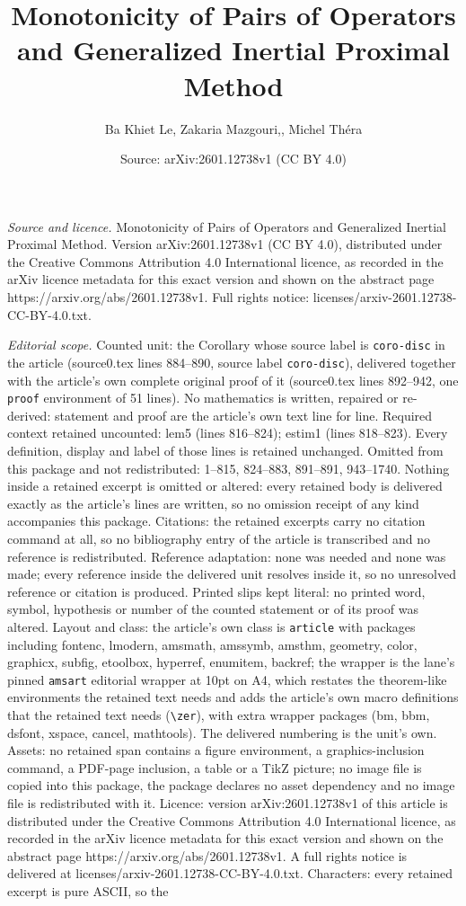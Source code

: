 \documentclass[10pt,a4paper]{amsart}
\title[Monotonicity of Pairs of Operators and Generalized Inertial ]{Monotonicity of Pairs of Operators and Generalized Inertial Proximal Method}
\author{Ba Khiet Le, Zakaria Mazgouri,, Michel Th\'era}
\date{Source: arXiv:2601.12738v1 (CC BY 4.0)}
\begin{document}
\maketitle

\noindent\emph{Source and licence.} Monotonicity of Pairs of Operators and Generalized Inertial Proximal Method. Version arXiv:2601.12738v1 (CC BY 4.0), distributed under the Creative Commons Attribution 4.0 International licence, as recorded in the arXiv licence metadata for this exact version and shown on the abstract page https://arxiv.org/abs/2601.12738v1. Full rights notice: licenses/arxiv-2601.12738-CC-BY-4.0.txt.\par\smallskip

\noindent\textit{Editorial scope.} Counted unit: the Corollary whose source label is \texttt{coro-disc} in the article (source0.tex lines 884--890, source label \texttt{coro-disc}), delivered together with the article's own complete original proof of it (source0.tex lines 892--942, one \texttt{proof} environment of 51 lines). No mathematics is written, repaired or re-derived: statement and proof are the article's own text line for line. Required context retained uncounted: lem5 (lines 816--824); estim1 (lines 818--823). Every definition, display and label of those lines is retained unchanged. Omitted from this package and not redistributed: 1--815, 824--883, 891--891, 943--1740. Nothing inside a retained excerpt is omitted or altered: every retained body is delivered exactly as the article's lines are written, so no omission receipt of any kind accompanies this package. Citations: the retained excerpts carry no citation command at all, so no bibliography entry of the article is transcribed and no reference is redistributed. Reference adaptation: none was needed and none was made; every reference inside the delivered unit resolves inside it, so no unresolved reference or citation is produced. Printed slips kept literal: no printed word, symbol, hypothesis or number of the counted statement or of its proof was altered. Layout and class: the article's own class is \texttt{article} with packages including fontenc, lmodern, amsmath, amssymb, amsthm, geometry, color, graphicx, subfig, etoolbox, hyperref, enumitem, backref; the wrapper is the lane's pinned \texttt{amsart} editorial wrapper at 10pt on A4, which restates the theorem-like environments the retained text needs and adds the article's own macro definitions that the retained text needs (\texttt{\textbackslash zer}), with extra wrapper packages (bm, bbm, dsfont, xspace, cancel, mathtools). The delivered numbering is the unit's own. Assets: no retained span contains a figure environment, a graphics-inclusion command, a PDF-page inclusion, a table or a TikZ picture; no image file is copied into this package, the package declares no asset dependency and no image file is redistributed with it. Licence: version arXiv:2601.12738v1 of this article is distributed under the Creative Commons Attribution 4.0 International licence, as recorded in the arXiv licence metadata for this exact version and shown on the abstract page https://arxiv.org/abs/2601.12738v1. A full rights notice is delivered at licenses/arxiv-2601.12738-CC-BY-4.0.txt. Characters: every retained excerpt is pure ASCII, so the 
\end{document}
